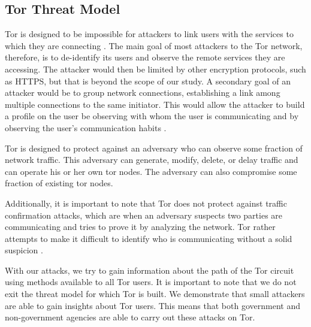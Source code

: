 \documentclass[12pt,journal]{IEEEtran}
\begin{document}
\subsection{Tor Threat Model}
Tor is designed to be impossible for attackers to link users with the services to which they are connecting \cite{Dingledine:2004:TSO:1251375.1251396}. The main goal of most attackers to the Tor network, therefore, is to de-identify its users and observe the remote services they are accessing. The attacker would then be limited by other encryption protocols, such as HTTPS, but that is beyond the scope of our study. A secondary goal of an attacker would be to group network connections, establishing a link among multiple connections to the same initiator. This would allow the attacker to build a profile on the user be observing with whom the user is communicating and by observing the user’s communication habits \cite{Murdoch:2005:LTA:1058433.1059390}.
\par
Tor is designed to protect against an adversary who can observe some fraction of network traffic. This adversary can generate, modify, delete, or delay traffic and can operate his or her own tor nodes. The adversary can also compromise some fraction of existing tor nodes\cite{Dingledine:2004:TSO:1251375.1251396}.
\par
Additionally, it is important to note that Tor does not protect against traffic confirmation attacks, which are when an adversary suspects two parties are communicating and tries to prove it by analyzing the network. Tor rather attempts to make it difficult to identify who is communicating without a solid suspicion \cite{Murdoch:2005:LTA:1058433.1059390}.
\par
With our attacks, we try to gain information about the path of the Tor circuit using methods available to all Tor users. It is important to note that we do not exit the threat model for which Tor is built. We demonstrate that small attackers are able to gain insights about Tor users. This means that both government and non-government agencies are able to carry out these attacks on Tor.
\end{document}
